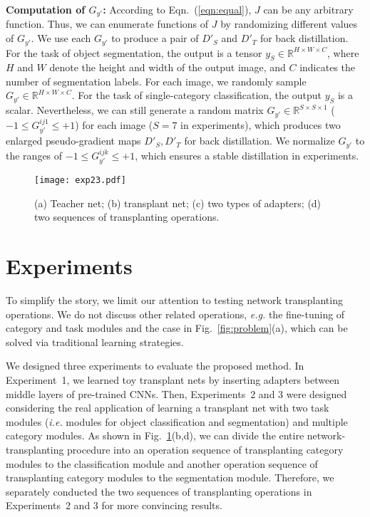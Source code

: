 \documentclass[10pt,twocolumn,letterpaper]{article}
\begin{document}
\textbf{Computation of {\small$G_{y'}$}:} According to Eqn.~(\ref{eqn:equal}), $J$ can be any arbitrary function. Thus, we can enumerate functions of $J$ by randomizing different values of {\small$G_{y'}$}. We use each {\small$G_{y'}$} to produce a pair of {\small$D'_{S}$} and {\small$D'_{T}$} for back distillation. For the task of object segmentation, the output is a tensor {\small$y_{S}\in\mathbb{R}^{H\times W\times C}$}, where {\small$H$} and {\small$W$} denote the height and width of the output image, and {\small$C$} indicates the number of segmentation labels. For each image, we randomly sample {\small$G_{y'}\in\mathbb{R}^{H\times W\times C}$}. For the task of single-category classification, the output {\small$y_{S}$} is a scalar. Nevertheless, we can still generate a random matrix {\small$G_{y'}\in\mathbb{R}^{S\times S\times 1}$} ({\small$-1\leq G_{y'}^{ij1}\leq+1$}) for each image ({\small$S\!=\!7$} in experiments), which produces two enlarged pseudo-gradient maps $D'_{S},D'_{T}$ for back distillation\textcolor{red}{\footnotemark[1]}. We normalize {\small$G_{y'}$} to the ranges of {\small$-1\leq G_{y'}^{ijk}\leq+1$}, which ensures a stable distillation in experiments.

\begin{figure}
\centering
\texttt{[image: exp23.pdf]}
\vspace{2pt}
\caption{(a) Teacher net; (b) transplant net; (c) two types of adapters; (d) two sequences of transplanting operations.}
\label{fig:exp23}
\end{figure}

\section{Experiments}

To simplify the story, we limit our attention to testing network transplanting operations. We do not discuss other related operations, \emph{e.g.} the fine-tuning of category and task modules and the case in Fig.~\ref{fig:problem}(a), which can be solved via traditional learning strategies.

We designed three experiments to evaluate the proposed method. In Experiment~1, we learned toy transplant nets by inserting adapters between middle layers of pre-trained CNNs. Then, Experiments~2 and 3 were designed considering the real application of learning a transplant net with two task modules (\emph{i.e.} modules for object classification and segmentation) and multiple category modules. As shown in Fig.~\ref{fig:exp23}(b,d), we can divide the entire network-transplanting procedure into an operation sequence of transplanting category modules to the classification module and another operation sequence of transplanting category modules to the segmentation module. Therefore, we separately conducted the two sequences of transplanting operations in Experiments~2 and 3 for more convincing results.
\end{document}

